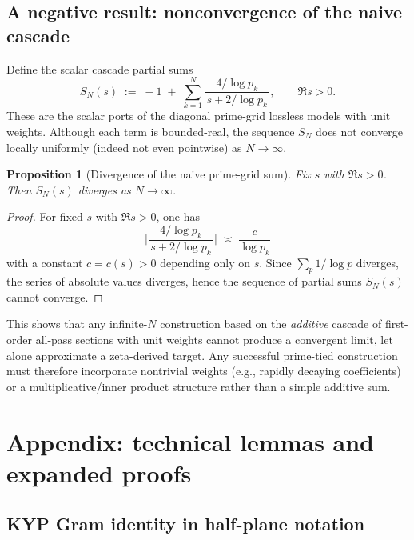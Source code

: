 \documentclass[11pt]{article}
\newtheorem{proposition}[theorem]{Proposition}
\theoremstyle{remark}
\begin{document}
\subsection*{A negative result: nonconvergence of the naive cascade}
Define the scalar cascade partial sums
\[
 S_N(s)\;:=\;-1\; +\;\sum_{k=1}^{N} \frac{4/\log p_k}{\,s+2/\log p_k\,},\qquad \Re s>0.
\]
These are the scalar ports of the diagonal prime-grid lossless models with unit weights. Although each term is bounded-real, the sequence \(S_N\) does not converge locally uniformly (indeed not even pointwise) as \(N\to\infty\).

\begin{proposition}[Divergence of the naive prime-grid sum]\label{prop:divergence}
Fix \(s\) with \(\Re s>0\). Then \(S_N(s)\) diverges as \(N\to\infty\).
\end{proposition}
\begin{proof}
For fixed \(s\) with \(\Re s>0\), one has
\[
 \Big|\frac{4/\log p_k}{\,s+2/\log p_k\,}\Big|\;\asymp\; \frac{c}{\log p_k}
\]
with a constant \(c=c(s)>0\) depending only on \(s\). Since \(\sum_{p}\!1/\log p\) diverges, the series of absolute values diverges, hence the sequence of partial sums \(S_N(s)\) cannot converge.
\end{proof}
\noindent This shows that any infinite-$N$ construction based on the \emph{additive} cascade of first-order all-pass sections with unit weights cannot produce a convergent limit, let alone approximate a zeta-derived target. Any successful prime-tied construction must therefore incorporate nontrivial weights (e.g., rapidly decaying coefficients) or a multiplicative/inner product structure rather than a simple additive sum.

\appendix
\section{Appendix: technical lemmas and expanded proofs}\label{sec:appendix}

\subsection{KYP Gram identity in half-plane notation}\label{app:KYP-gram}
\end{document}
